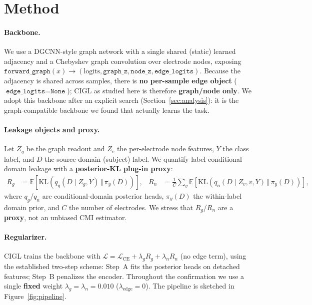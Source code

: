\section{Method}

\paragraph{Backbone.} We use a DGCNN-style graph network with a single shared (static) learned adjacency and
a Chebyshev graph convolution over electrode nodes, exposing
$\texttt{forward\_graph}(x) \rightarrow (\text{logits}, \texttt{graph\_z}, \texttt{node\_z},
\texttt{edge\_logits})$. Because the adjacency is shared across samples, there is \textbf{no per-sample edge
object} ($\texttt{edge\_logits} = \texttt{None}$); CIGL as studied here is therefore \textbf{graph/node only}.
We adopt this backbone after an explicit search (Section~\ref{sec:analysis}): it is the graph-compatible
backbone we found that actually learns the task.

\paragraph{Leakage objects and proxy.} Let $Z_g$ be the graph readout and $Z_v$ the per-electrode node
features, $Y$ the class label, and $D$ the source-domain (subject) label. We quantify label-conditional
domain leakage with a \textbf{posterior-KL plug-in proxy}:
\begin{align}
R_g &= \mathbb{E}\!\left[ \mathrm{KL}\!\left( q_g(D \mid Z_g, Y) \,\Vert\, \pi_y(D) \right) \right], &
R_n &= \frac{1}{C} \sum_{v} \mathbb{E}\!\left[ \mathrm{KL}\!\left( q_n(D \mid Z_v, v, Y) \,\Vert\,
\pi_y(D) \right) \right],
\end{align}
where $q_g$/$q_n$ are conditional-domain posterior heads, $\pi_y(D)$ the within-label domain prior, and $C$
the number of electrodes. We stress that $R_g$/$R_n$ are a \textbf{proxy}, not an unbiased CMI estimator.

\paragraph{Regularizer.} CIGL trains the backbone with $\mathcal{L} = \mathcal{L}_{\mathrm{CE}} +
\lambda_g R_g + \lambda_n R_n$ (no edge term), using the established two-step scheme: Step~A fits the
posterior heads on detached features; Step~B penalizes the encoder. Throughout the confirmation we use a
single \textbf{fixed} weight $\lambda_g = \lambda_n = 0.010$ ($\lambda_{\mathrm{edge}} = 0$). The pipeline is
sketched in Figure~\ref{fig:pipeline}.

